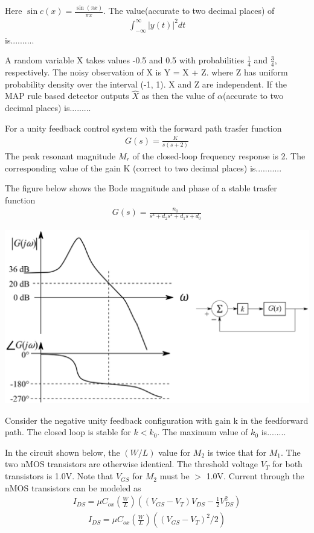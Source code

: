 Here $\sin c(x) = \frac{\sin(\pi x)}{\pi x}$. The value(accurate to two decimal places) of
\begin{align*} 
\int_{-\infty}^{\infty}|y(t)|^{2}dt
\end{align*}
is..........

\item A random variable X takes values -0.5 and 0.5 with probabilities $\frac{1}{4}$ and $\frac{3}{4}$, respectively. The noisy observation of X is Y = X + Z. where Z has uniform probability density over the interval (-1, 1). X and Z are independent. If the MAP rule based detector outputs $\hat{X}$ as
then the value of $\alpha$(accurate to two decimal places) is.........

\item For a unity feedback control system with the forward path trasfer function
\begin{align*}
G(s) = \frac{K}{s(s + 2)}
\end{align*}
The peak resonant magnitude $M_r$ of the closed-loop frequency response is 2. The corresponding value of the gain K (correct to two decimal places) is...........

\item The figure below shows the Bode magnitude and phase of a stable trasfer function
\begin{align*}
G(s) = \frac{n_0}{s^3 + d_2s^2 + d_1s + d_0}
\end{align*}

\includegraphics[scale=0.24]{52}

Consider the negative unity feedback configuration with gain k in the feedforward path. The closed loop is stable for 
$k < k_0$. The maximum value of $k_0$ is........

\item In the circuit shown below, the $(W/L)$ value for $M_2$ is twice that for $M_1$. The two nMOS transistors are otherwise identical. The threshold voltage $V_T$ for both transistors is 1.0V. Note that $V_{GS}$ for $M_2$ must be $>$ 1.0V.
Current through the nMOS transistors can be modeled as
\begin{align*}
I_{DS} = \mu C_{ox}\left(\frac{W}{L}\right)\left((V_{GS} - V_T)V_{DS} - \frac{1}{2}V^{2}_{DS}\right)
\end{align*}
\begin{align*}
I_{DS} = \mu C_{ox}\left(\frac{W}{L}\right)\left((V_{GS} - V_T)^{2}/2\right)
\end{align*}

